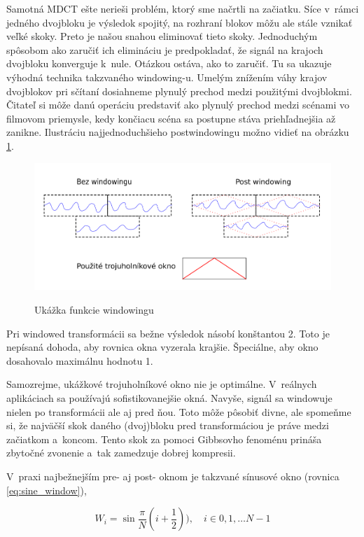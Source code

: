 Samotná MDCT ešte nerieši problém, ktorý sme načrtli na začiatku.
Síce v~rámci jedného dvojbloku je výsledok spojitý,
na rozhraní blokov môžu ale stále vznikať veľké skoky.
Preto je našou snahou eliminovať tieto skoky. Jednoduchým spôsobom ako
zaručiť ich elimináciu je predpokladať, že signál na krajoch dvojbloku
konverguje k~nule. Otázkou ostáva, ako to zaručiť. Tu sa ukazuje
výhodná technika takzvaného windowing-u. Umelým znížením váhy krajov
dvojblokov pri sčítaní dosiahneme plynulý prechod medzi použitými
dvojblokmi. Čitateľ si môže danú operáciu predstaviť ako plynulý
prechod medzi scénami vo filmovom priemysle, kedy končiacu scéna
sa postupne stáva priehľadnejšia až zanikne.
Ilustráciu najjednoduchšieho postwindowingu možno vidieť na obrázku
\ref{fig:post_windowing}.
\begin{figure}[htp]
    \centering
    \includegraphics{obrazky/informatika/audio/post_windowing}
    \label{fig:post_windowing}
    \caption{Ukážka funkcie windowingu}
\end{figure}

\begin{poznamka}
    Pri windowed transformácii sa bežne výsledok násobí konštantou 2.
    Toto je nepísaná dohoda, aby rovnica okna vyzerala krajšie.
    Špeciálne, aby okno dosahovalo maximálnu hodnotu 1.
\end{poznamka}
Samozrejme, ukážkové trojuholníkové okno nie je optimálne.
V~reálnych aplikáciach sa používajú sofistikovanejšie okná.
Navyše, signál sa windowuje nielen po transformácii ale aj pred ňou. Toto
môže pôsobiť divne, ale spomeňme si, že najväčší skok daného
(dvoj)bloku pred transformáciou je práve medzi začiatkom a~koncom.
Tento skok za pomoci Gibbsovho fenoménu prináša zbytočné zvonenie 
a~tak zamedzuje dobrej kompresii.

V~praxi najbežnejším pre- aj post- oknom je takzvané sínusové okno
(rovnica \eqref{eq:sine_window}),

\begin{equation}
    W_i = \sin \frac{\pi}{N} (i + \frac{1}{2})),\quad  i\in 0,1,\dots
    N-1
    \label{eq:sine_window}
\end{equation}

